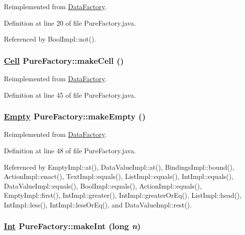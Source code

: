 Reimplemented from \hyperlink{interfaceDataFactory_a4}{Data\-Factory}.

Definition at line 20 of file Pure\-Factory.java.

Referenced by Bool\-Impl::not().

\hypertarget{classPureFactory_a10}{
\subsubsection[makeCell]{\setlength{\rightskip}{0pt plus 5cm}\hyperlink{interfaceCell}{Cell} Pure\-Factory::make\-Cell ()}}
\label{classPureFactory_a10}




Reimplemented from \hyperlink{interfaceDataFactory_a12}{Data\-Factory}.

Definition at line 45 of file Pure\-Factory.java.\hypertarget{classPureFactory_a11}{
\subsubsection[makeEmpty]{\setlength{\rightskip}{0pt plus 5cm}\hyperlink{interfaceEmpty}{Empty} Pure\-Factory::make\-Empty ()}}
\label{classPureFactory_a11}




Reimplemented from \hyperlink{interfaceDataFactory_a0}{Data\-Factory}.

Definition at line 48 of file Pure\-Factory.java.

Referenced by Empty\-Impl::at(), Data\-Value\-Impl::at(), Bindings\-Impl::bound(), Action\-Impl::enact(), Text\-Impl::equals(), List\-Impl::equals(), Int\-Impl::equals(), Data\-Value\-Impl::equals(), Bool\-Impl::equals(), Action\-Impl::equals(), Empty\-Impl::first(), Int\-Impl::greater(), Int\-Impl::greater\-Or\-Eq(), List\-Impl::head(), Int\-Impl::less(), Int\-Impl::less\-Or\-Eq(), and Data\-Value\-Impl::rest().

\hypertarget{classPureFactory_a1}{
\subsubsection[makeInt]{\setlength{\rightskip}{0pt plus 5cm}\hyperlink{interfaceInt}{Int} Pure\-Factory::make\-Int (long {\em n})}}
\label{classPureFactory_a1}




